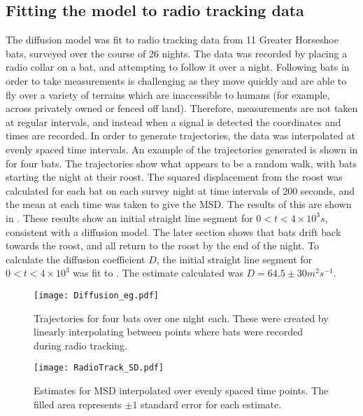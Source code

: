 \subsection{Fitting the model to radio tracking data}
%
The diffusion model was fit to radio tracking data from 11 Greater Horseshoe bats, surveyed over the course of 26 nights. The data was recorded by placing a radio collar on a bat, and attempting to follow it over a night. Following bats in order to take measurements is challenging as they move quickly and are able to fly over a variety of terrains which are inaccessible to humans (for example, across privately owned or fenced off land). Therefore, measurements are not taken at regular intervals, and instead when a signal is detected the coordinates and times are recorded. In order to generate trajectories, the data was interpolated at evenly spaced time intervals. An example of the trajectories generated is shown in  for four bats. The trajectories show what appears to be a random walk, with bats starting the night at their roost. The squared displacement from the roost was calculated for each bat on each survey night at time intervals of 200 seconds, and the mean at each time was taken to give the MSD. The results of this are shown in . These results show an initial straight line segment for $0 < t < 4 \times 10^3 s$, consistent with a diffusion model. The later section shows that bats drift back towards the roost, and all return to the roost by the end of the night. To calculate the diffusion coefficient $D$, the initial straight line segment for $0 < t < 4 \times 10^3$ was fit to . The estimate calculated was $D = 64.5 \pm 30 m^2s^{-1}$.

\begin{figure} [h]
\centering
      \texttt{[image: Diffusion\_eg.pdf]}
      \caption{Trajectories for four bats over one night each. These were created by linearly interpolating between points where bats were recorded during radio tracking.}
      \label{fig:Diffusion_eg}
\end{figure}

\begin{figure} [h]
\centering
      \texttt{[image: RadioTrack\_SD.pdf]}
      \caption{Estimates for MSD interpolated over evenly spaced time points. The filled area represents $\pm 1$ standard error for each estimate.}
      \label{fig:RadioTrackD_SD}
\end{figure}

